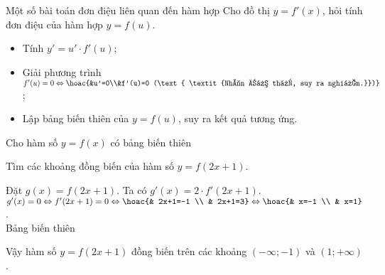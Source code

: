 \begin{dang}{Một số bài toán đơn điệu liên quan đến hàm hợp}
    Cho đồ thị $y=f'(x)$, hỏi tính đơn điệu của hàm hợp $y=f(u)$.
    \begin{itemize}
        \item Tính $y'=u' \cdot f'(u)$;
        \item Giải phương trình $f'(u)=0 \Leftrightarrow \hoac{&u'=0\\&f'(u)=0 (\text{ \textit{Nhìn đồ thị, suy ra nghiệm.}})}$;
        \item Lập bảng biến thiên của $y=f(u)$, suy ra kết quả tương ứng.
    \end{itemize}
\end{dang}

\begin{vd}
    Cho hàm số $y=f(x)$ có bảng biến thiên
    \begin{center}
    \end{center}
    Tìm các khoảng đồng biến của hàm số $y=f(2 x+1)$.
    \loigiai
    {
        Đặt $g(x)=f(2 x+1)$. Ta có $g'(x)=2 \cdot f'(2 x+1)$.\\
        $g'(x)=0\Leftrightarrow f'(2x+1)=0\Leftrightarrow\hoac{& 2x+1=-1 \\ & 2x+1=3}\Leftrightarrow\hoac{& x=-1 \\ & x=1}$.\\
        Bảng biến thiên
        \begin{center}
        \end{center}
        Vậy hàm số $y=f(2 x+1)$ đồng biến trên các khoảng $(-\infty ;-1)$ và $(1 ;+\infty)$.
    }
\end{vd}

